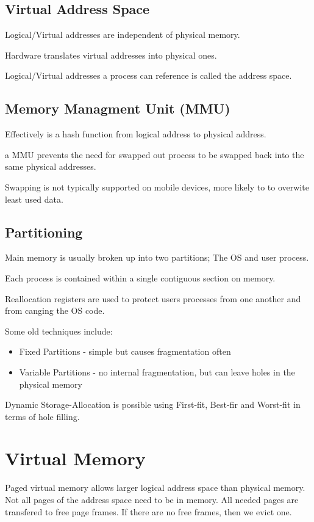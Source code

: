 \documentclass{article}
\begin{document}
\subsection{Virtual Address Space}
Logical/Virtual addresses are independent of physical memory.

Hardware translates virtual addresses into physical ones.

Logical/Virtual addresses a process can reference is called the address space.

\subsection{Memory Managment Unit (MMU)}
Effectively is a hash function from logical address to physical address.

a MMU prevents the need for swapped out process to be swapped back into the same physical addresses.

Swapping is not typically supported on mobile devices, more likely to to overwite least used data.


\subsection{Partitioning}
Main memory is usually broken up into two partitions; The OS and user process.

Each process is contained within a single contiguous section on memory.

Reallocation registers are used to protect users processes from one another and from canging the OS code.

Some old techniques include:
\begin{itemize}
    \item Fixed Partitions - simple but causes fragmentation often
    \item Variable Partitions - no internal fragmentation, but can leave holes in the physical memory
\end{itemize}

Dynamic Storage-Allocation is possible using First-fit, Best-fir and Worst-fit in terms of hole filling.

\section{Virtual Memory}
Paged virtual memory allows larger logical address space than physical memory.
Not all pages of the address space need to be in memory. All needed pages are transfered to free page frames.
If there are no free frames, then we evict one.
\end{document}
